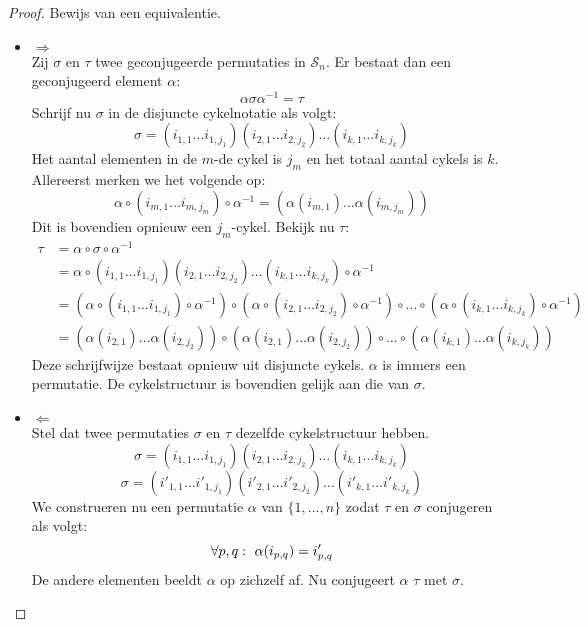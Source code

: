 \documentclass[main.tex]{subfiles}
\begin{document}
\begin{ei}
  \begin{proof}
    Bewijs van een equivalentie.
    \begin{itemize}
    \item $\Rightarrow$\\
      Zij $\sigma$ en $\tau$ twee geconjugeerde permutaties in $\mathcal{S}_{n}$.
      Er bestaat dan een geconjugeerd element $\alpha$:
      \[ \alpha \sigma \alpha^{-1} = \tau \]
      Schrijf nu $\sigma$ in de disjuncte cykelnotatie als volgt:
      \[ \sigma = (i_{1,1}\dotsc i_{1,j_{1}})(i_{2,1}\dotsc i_{2,j_{2}}) \dotsc (i_{k,1}\dotsc i_{k,j_{k}}) \]
      Het aantal elementen in de $m$-de cykel is $j_{m}$ en het totaal aantal cykels is $k$.
      Allereerst merken we het volgende op:
      \[ \alpha \circ (i_{m,1}\dotsc i_{m,j_{m}}) \circ \alpha^{-1} = (\alpha(i_{m,1})\dotsc\alpha(i_{m,j_{m}})) \]
      Dit is bovendien opnieuw een $j_{m}$-cykel.
      Bekijk nu $\tau$:
      \[ 
      \begin{array}{rl}
      \tau &= \alpha \circ \sigma \circ \alpha^{-1}\\
           &= \alpha \circ (i_{1,1}\dotsc i_{1,j_{1}})(i_{2,1}\dotsc i_{2,j_{2}}) \dotsc (i_{k,1}\dotsc i_{k,j_{k}}) \circ \alpha^{-1}\\
           &= (\alpha \circ (i_{1,1}\dotsc i_{1,j_{1}})\circ \alpha^{-1}) \circ (\alpha \circ(i_{2,1}\dotsc i_{2,j_{2}})\circ \alpha^{-1}) \circ \dotsc \circ (\alpha \circ(i_{k,1}\dotsc i_{k,j_{k}}) \circ \alpha^{-1})\\
           &= (\alpha(i_{2,1})\dotsc\alpha(i_{2,j_{2}})) \circ (\alpha(i_{2,1})\dotsc\alpha(i_{2,j_{2}})) \circ \dotsc \circ (\alpha(i_{k,1})\dotsc\alpha(i_{k,j_{k}}))
      \end{array}
      \]
      Deze schrijfwijze bestaat opnieuw uit disjuncte cykels.
      $\alpha$ is immers een permutatie.
      De cykelstructuur is bovendien gelijk aan die van $\sigma$.
    \item $\Leftarrow$\\
      Stel dat twee permutaties $\sigma$ en $\tau$ dezelfde cykelstructuur hebben.
      \[ \sigma = (i_{1,1}\dotsc i_{1,j_{1}})(i_{2,1}\dotsc i_{2,j_{2}}) \dotsc (i_{k,1}\dotsc i_{k,j_{k}}) \]
      \[ \sigma = (i'_{1,1}\dotsc i'_{1,j_{1}})(i'_{2,1}\dotsc i'_{2,j_{2}}) \dotsc (i'_{k,1}\dotsc i'_{k,j_{k}}) \]
      We construeren nu een permutatie $\alpha$ van $\{ 1,\dotsc,n \}$ zodat $\tau$ en $\sigma$ conjugeren als volgt:
      \[
        \forall p,q:\ \alpha(i_{p,q}) = i'_{p,q}\\
      \]
      De andere elementen beeldt $\alpha$ op zichzelf af.
      Nu conjugeert $\alpha$ $\tau$ met $\sigma$.
    \end{itemize}
  \end{proof}
\end{ei}
\end{document}
